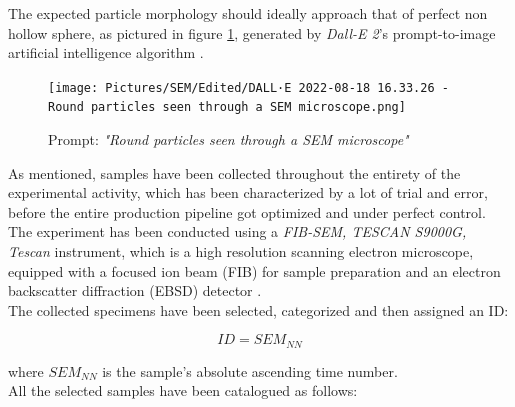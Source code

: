\documentclass{article}
\begin{document}
        The expected particle morphology should ideally approach that of perfect non hollow sphere, as pictured in figure \ref{fig:SEM_DALLE2}, generated by \textit{Dall-E 2}'s 
        prompt-to-image artificial intelligence algorithm \autocites{DALLE2}{DALLE2_roundparticles}. 

            \begin{figure}[h!]
                \centering
                \texttt{[image: Pictures/SEM/Edited/DALL·E 2022-08-18 16.33.26 - Round particles seen through a SEM microscope.png]}
                \caption{Prompt: \textit{"Round particles seen through a SEM microscope"}}
                \label{fig:SEM_DALLE2}
            \end{figure}

            \clearpage

            As mentioned, samples have been collected throughout the entirety of the experimental activity, which has been characterized by a lot of trial and error, 
            before the entire production pipeline got optimized and 
            under perfect control. \\ 

            The experiment has been conducted using a \textit{FIB-SEM, TESCAN S9000G, Tescan} instrument, which is a high resolution 
            scanning electron microscope, equipped with a focused ion beam (FIB) for sample preparation and 
            an electron backscatter diffraction (EBSD) detector \autocites{FIB-SEM_TESCAN_S9000G}. \\

            The collected specimens have been selected, categorized and then assigned an ID:

            \begin{equation}
                ID = SEM_{NN}
                \label{eq:SEM_ID}
            \end{equation}

            where $SEM_{NN}$ is the sample's absolute ascending time number. \\ 


            All the selected samples have been catalogued as follows:
\end{document}
